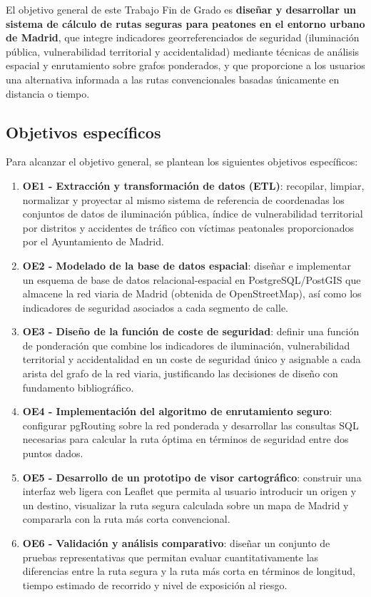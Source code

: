 El objetivo general de este Trabajo Fin de Grado es \textbf{diseñar y desarrollar un sistema de cálculo de rutas seguras para peatones en el entorno urbano de Madrid}, que integre indicadores georreferenciados de seguridad (iluminación pública, vulnerabilidad territorial y accidentalidad) mediante técnicas de análisis espacial y enrutamiento sobre grafos ponderados, y que proporcione a los usuarios una alternativa informada a las rutas convencionales basadas únicamente en distancia o tiempo.

\subsection{Objetivos específicos}
\label{subsec:objetivos_especificos}

Para alcanzar el objetivo general, se plantean los siguientes objetivos específicos:

\begin{enumerate}
    \item \textbf{OE1 - Extracción y transformación de datos (ETL)}: recopilar, limpiar, normalizar y proyectar al mismo sistema de referencia de coordenadas los conjuntos de datos de iluminación pública, índice de vulnerabilidad territorial por distritos y accidentes de tráfico con víctimas peatonales proporcionados por el Ayuntamiento de Madrid.

    \item \textbf{OE2 - Modelado de la base de datos espacial}: diseñar e implementar un esquema de base de datos relacional-espacial en PostgreSQL/PostGIS que almacene la red viaria de Madrid (obtenida de OpenStreetMap), así como los indicadores de seguridad asociados a cada segmento de calle.

    \item \textbf{OE3 - Diseño de la función de coste de seguridad}: definir una función de ponderación que combine los indicadores de iluminación, vulnerabilidad territorial y accidentalidad en un coste de seguridad único y asignable a cada arista del grafo de la red viaria, justificando las decisiones de diseño con fundamento bibliográfico.
    
    \item \textbf{OE4 - Implementación del algoritmo de enrutamiento seguro}: configurar pgRouting sobre la red ponderada y desarrollar las consultas SQL necesarias para calcular la ruta óptima en términos de seguridad entre dos puntos dados.
    
    \item \textbf{OE5 - Desarrollo de un prototipo de visor cartográfico}: construir una interfaz web ligera con Leaflet que permita al usuario introducir un origen y un destino, visualizar la ruta segura calculada sobre un mapa de Madrid y compararla con la ruta más corta convencional.
    
    \item \textbf{OE6 - Validación y análisis comparativo}: diseñar un conjunto de pruebas representativas que permitan evaluar cuantitativamente las diferencias entre la ruta segura y la ruta más corta en términos de longitud, tiempo estimado de recorrido y nivel de exposición al riesgo.
\end{enumerate}

